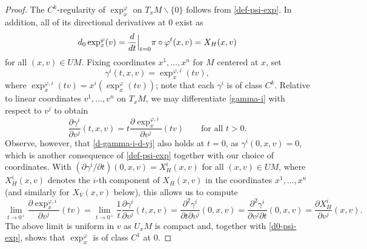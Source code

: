 \documentclass[10pt,a4paper]{amsart}
\begin{document}
\begin{proof}
 The $C^k$-regularity of $\exp^{\varphi}_x$ on $T_xM \smallsetminus \{0\}$ follows from \eqref{def-psi-exp}. In addition, all of its directional derivatives at $0$ exist as
 \begin{equation}\label{d0-psi-exp} {\rm d}_0\exp_x^{\varphi}(v) = \frac{\rm d}{{\rm d}t} \Big|_{t=0} \pi \circ \varphi^t(x,v) = X_H(x,v)\end{equation}for all $(x,v)\in UM$. Fixing coordinates $x^1, \ldots, x^n$ for $M$ centered at $x$, set
 \begin{equation}\label{gamma-i}
 \gamma^i(t,x,v) = \exp_x^{\varphi, i}(tv),
 \end{equation}where $\exp_x^{\varphi, i}(tv) = x^i(\exp_x^{\varphi}(tv))$; note that each $\gamma^i$ is of class $C^k$. Relative to linear coordinates $v^1,\ldots, v^n$ on $T_xM$, we may differentiate \eqref{gamma-i} with respect to $v^j$ to obtain
 \begin{equation}\label{d-gamma-i-d-vj}
 \frac{\partial \gamma^i}{\partial v^j}(t,x,v) =t \frac{\partial \exp_x^{\varphi,i}}{\partial v^j}(tv) \qquad\mbox{for all }t>0.
 \end{equation}Observe, however, that \eqref{d-gamma-i-d-vj} also holds at $t=0$, as $\gamma^i(0,x,v) = 0$, which is another consequence of \eqref{def-psi-exp} together with our choice of coordinates. With $(\partial \gamma^i/\partial t)(0,x,v) = X_H^i(x,v)$ for all $(x,v)\in UM$, where $X_H^i(x,v)$ denotes the $i$-th component of $X_H(x,v)$ in the coordinates $x^1,\ldots, x^n$ (and similarly for $X_V(x,v)$ below), this allows us to compute
 \begin{equation*}
\lim_{t\to 0^+} \frac{\partial \exp_x^{\varphi, i}}{\partial v^j}(tv) = \lim_{t\to 0^+} \frac{1}{t} \frac{\partial \gamma^i}{\partial v^j}(t,x,v) = \frac{\partial^2 \gamma^i}{\partial t \partial v^j}(0,x,v) = \frac{\partial^2 \gamma^i}{\partial v^j \partial t}(0,x,v) = \frac{\partial X_H^i}{\partial v^j}(x,v).
 \end{equation*}
The above limit is uniform in $v$ as $U_xM$ is compact and, together with \eqref{d0-psi-exp}, shows that $\exp_x^{\varphi}$ is of class $C^1$ at $0$.


\end{proof}
\end{document}
